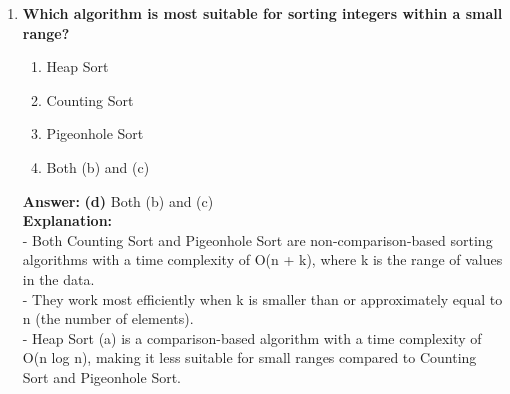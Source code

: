 \begin{enumerate}
    \item \textbf{Which algorithm is most suitable for sorting integers within a small range?}
    \begin{enumerate}
        \item Heap Sort
        \item Counting Sort
        \item Pigeonhole Sort
        \item Both (b) and (c)
    \end{enumerate}
    \textbf{Answer:} \textbf{(d)} Both (b) and (c) \\
    \textbf{Explanation:} \\
    - Both Counting Sort and Pigeonhole Sort are non-comparison-based sorting algorithms with a time complexity of O(n + k), where k is the range of values in the data. \\
    - They work most efficiently when k is smaller than or approximately equal to n (the number of elements). \\
    - Heap Sort (a) is a comparison-based algorithm with a time complexity of O(n log n), making it less suitable for small ranges compared to Counting Sort and Pigeonhole Sort.
\end{enumerate}
